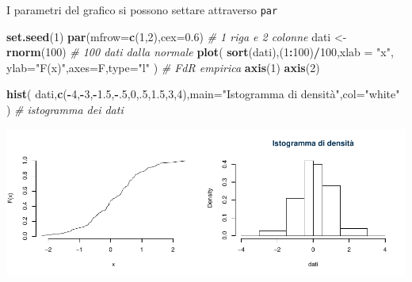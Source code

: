 \documentclass[
  11pt,
]{book}
\newenvironment{Shaded}{\begin{snugshade}}{\end{snugshade}}
\newcommand{\AttributeTok}[1]{\textcolor[rgb]{0.13,0.29,0.53}{#1}}
\newcommand{\CommentTok}[1]{\textcolor[rgb]{0.56,0.35,0.01}{\textit{#1}}}
\newcommand{\DecValTok}[1]{\textcolor[rgb]{0.00,0.00,0.81}{#1}}
\newcommand{\FloatTok}[1]{\textcolor[rgb]{0.00,0.00,0.81}{#1}}
\newcommand{\FunctionTok}[1]{\textcolor[rgb]{0.13,0.29,0.53}{\textbf{#1}}}
\newcommand{\NormalTok}[1]{#1}
\newcommand{\OtherTok}[1]{\textcolor[rgb]{0.56,0.35,0.01}{#1}}
\newcommand{\SpecialCharTok}[1]{\textcolor[rgb]{0.81,0.36,0.00}{\textbf{#1}}}
\newcommand{\StringTok}[1]{\textcolor[rgb]{0.31,0.60,0.02}{#1}}
\theoremstyle{mytheoremstyle}
\theoremstyle{mydefstyle}
\begin{document}
I parametri del grafico si possono settare attraverso \texttt{par}

\begin{Shaded}
\begin{Highlighting}[]
\FunctionTok{set.seed}\NormalTok{(}\DecValTok{1}\NormalTok{)}
\FunctionTok{par}\NormalTok{(}\AttributeTok{mfrow=}\FunctionTok{c}\NormalTok{(}\DecValTok{1}\NormalTok{,}\DecValTok{2}\NormalTok{),}\AttributeTok{cex=}\FloatTok{0.6}\NormalTok{) }\CommentTok{\# 1 riga e 2 colonne}
\NormalTok{dati }\OtherTok{\textless{}{-}} \FunctionTok{rnorm}\NormalTok{(}\DecValTok{100}\NormalTok{) }\CommentTok{\# 100 dati dalla normale}
\FunctionTok{plot}\NormalTok{(}
  \FunctionTok{sort}\NormalTok{(dati),(}\DecValTok{1}\SpecialCharTok{:}\DecValTok{100}\NormalTok{)}\SpecialCharTok{/}\DecValTok{100}\NormalTok{,}\AttributeTok{xlab =} \StringTok{"x"}\NormalTok{, }\AttributeTok{ylab=}\StringTok{"F(x)"}\NormalTok{,}\AttributeTok{axes=}\NormalTok{F,}\AttributeTok{type=}\StringTok{"l"}
\NormalTok{  ) }\CommentTok{\# FdR empirica}
\FunctionTok{axis}\NormalTok{(}\DecValTok{1}\NormalTok{)}
\FunctionTok{axis}\NormalTok{(}\DecValTok{2}\NormalTok{)}

\FunctionTok{hist}\NormalTok{(}
\NormalTok{  dati,}\FunctionTok{c}\NormalTok{(}\SpecialCharTok{{-}}\DecValTok{4}\NormalTok{,}\SpecialCharTok{{-}}\DecValTok{3}\NormalTok{,}\SpecialCharTok{{-}}\FloatTok{1.5}\NormalTok{,}\SpecialCharTok{{-}}\NormalTok{.}\DecValTok{5}\NormalTok{,}\DecValTok{0}\NormalTok{,.}\DecValTok{5}\NormalTok{,}\FloatTok{1.5}\NormalTok{,}\DecValTok{3}\NormalTok{,}\DecValTok{4}\NormalTok{),}\AttributeTok{main=}\StringTok{"Istogramma di densità"}\NormalTok{,}\AttributeTok{col=}\StringTok{"white"}
\NormalTok{  ) }\CommentTok{\# istogramma dei dati}
\end{Highlighting}
\end{Shaded}

\begin{center}\includegraphics{Appunti_di_Statistica_2025_files/figure-latex/24-Libro-34-1} \end{center}
\end{document}
